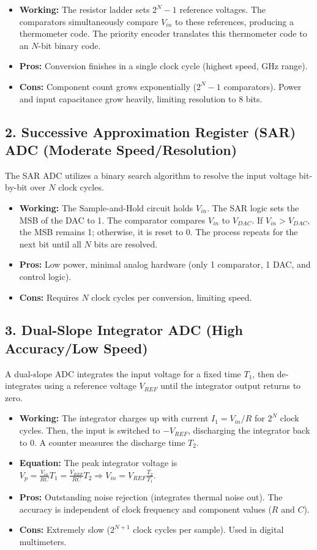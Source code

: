 \documentclass[12pt,a4paper]{article}
\begin{document}
\begin{itemize}[leftmargin=*, itemsep=2pt]
  \item \textbf{Working:} The resistor ladder sets $2^N-1$ reference voltages. The comparators simultaneously compare $V_{in}$ to these references, producing a thermometer code. The priority encoder translates this thermometer code to an $N$-bit binary code.
  \item \textbf{Pros:} Conversion finishes in a single clock cycle (highest speed, GHz range).
  \item \textbf{Cons:} Component count grows exponentially ($2^N-1$ comparators). Power and input capacitance grow heavily, limiting resolution to 8 bits.
\end{itemize}

\subsection{2. Successive Approximation Register (SAR) ADC (Moderate Speed/Resolution)}
The SAR ADC utilizes a binary search algorithm to resolve the input voltage bit-by-bit over $N$ clock cycles.
\begin{itemize}[leftmargin=*, itemsep=2pt]
  \item \textbf{Working:} The Sample-and-Hold circuit holds $V_{in}$. The SAR logic sets the MSB of the DAC to 1. The comparator compares $V_{in}$ to $V_{DAC}$. If $V_{in} > V_{DAC}$, the MSB remains 1; otherwise, it is reset to 0. The process repeats for the next bit until all $N$ bits are resolved.
  \item \textbf{Pros:} Low power, minimal analog hardware (only 1 comparator, 1 DAC, and control logic).
  \item \textbf{Cons:} Requires $N$ clock cycles per conversion, limiting speed.
\end{itemize}

\subsection{3. Dual-Slope Integrator ADC (High Accuracy/Low Speed)}
A dual-slope ADC integrates the input voltage for a fixed time $T_1$, then de-integrates using a reference voltage $V_{REF}$ until the integrator output returns to zero.
\begin{itemize}[leftmargin=*, itemsep=2.5pt]
  \item \textbf{Working:} The integrator charges up with current $I_1 = V_{in}/R$ for $2^N$ clock cycles. Then, the input is switched to $-V_{REF}$, discharging the integrator back to 0. A counter measures the discharge time $T_2$.
  \item \textbf{Equation:} The peak integrator voltage is $V_p = \frac{V_{in}}{RC} T_1 = \frac{V_{REF}}{RC} T_2 \Rightarrow V_{in} = V_{REF} \frac{T_2}{T_1}$.
  \item \textbf{Pros:} Outstanding noise rejection (integrates thermal noise out). The accuracy is independent of clock frequency and component values ($R$ and $C$).
  \item \textbf{Cons:} Extremely slow ($2^{N+1}$ clock cycles per sample). Used in digital multimeters.
\end{itemize}
\end{document}
